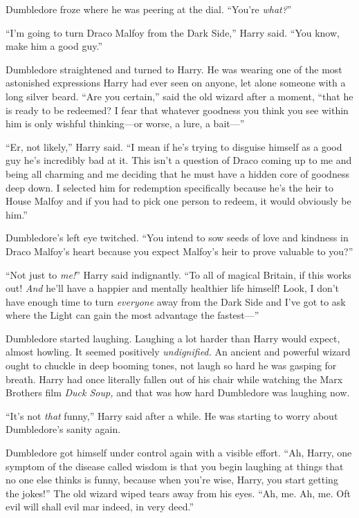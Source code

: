 Dumbledore froze where he was peering at the dial. “You’re \emph{what?}”

“I’m going to turn Draco Malfoy from the Dark Side,” Harry said. “You know, make him a good guy.”

Dumbledore straightened and turned to Harry. He was wearing one of the most astonished expressions Harry had ever seen on anyone, let alone someone with a long silver beard. “Are you certain,” said the old wizard after a moment, “that he is ready to be redeemed? I fear that whatever goodness you think you see within him is only wishful thinking—or worse, a lure, a bait—”

“Er, not likely,” Harry said. “I mean if he’s trying to disguise himself as a good guy he’s incredibly bad at it. This isn’t a question of Draco coming up to me and being all charming and me deciding that he must have a hidden core of goodness deep down. I selected him for redemption specifically because he’s the heir to House Malfoy and if you had to pick one person to redeem, it would obviously be him.”

Dumbledore’s left eye twitched. “You intend to sow seeds of love and kindness in Draco Malfoy’s heart because you expect Malfoy’s heir to prove valuable to you?”

“Not just to \emph{me!}” Harry said indignantly. “To all of magical Britain, if this works out! \emph{And} he’ll have a happier and mentally healthier life himself! Look, I don’t have enough time to turn \emph{everyone} away from the Dark Side and I’ve got to ask where the Light can gain the most advantage the fastest—”

Dumbledore started laughing. Laughing a lot harder than Harry would expect, almost howling. It seemed positively \emph{undignified.} An ancient and powerful wizard ought to chuckle in deep booming tones, not laugh so hard he was gasping for breath. Harry had once literally fallen out of his chair while watching the Marx Brothers film \emph{Duck Soup,} and that was how hard Dumbledore was laughing now.

“It’s not \emph{that} funny,” Harry said after a while. He was starting to worry about Dumbledore’s sanity again.

Dumbledore got himself under control again with a visible effort. “Ah, Harry, one symptom of the disease called wisdom is that you begin laughing at things that no one else thinks is funny, because when you’re wise, Harry, you start getting the jokes!” The old wizard wiped tears away from his eyes. “Ah, me. Ah, me. Oft evil will shall evil mar indeed, in very deed.”

